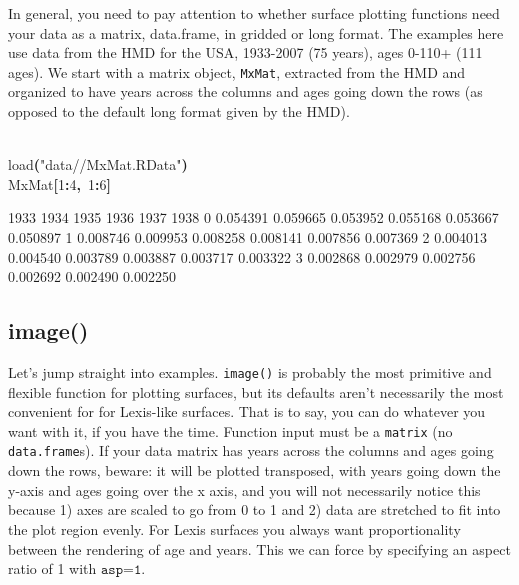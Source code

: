\documentclass[a4paper]{article}
\newcommand{\hlnumber}[1]{\textcolor[rgb]{0.0823529411764706,0.0784313725490196,0.709803921568627}{#1}}%
\newcommand{\hlfunctioncall}[1]{\textcolor[rgb]{1,0,0}{#1}}%
\newcommand{\hlstring}[1]{\textcolor[rgb]{0.6,0.6,1}{#1}}%
\newcommand{\hlkeyword}[1]{\textcolor[rgb]{0,0,0}{\textbf{#1}}}%
\newcommand{\hlsymbol}[1]{\textcolor[rgb]{0,0,0}{#1}}%
\newcommand{\hlprompt}[1]{\textcolor[rgb]{0,0,0}{#1}}%
\newcommand{\hlstd}[1]{\textcolor[rgb]{0,0,0}{#1}}%
\newenvironment{Houtput}{\raggedright}{%
%
}
\renewenvironment{Schunk}{\vspace{\topsep}}{\vspace{\topsep}}
\begin{document}
In general, you need to pay attention to whether surface plotting functions need your data as a matrix, data.frame, in gridded or long format. The examples here use data from the HMD for the USA, 1933-2007 (75 years), ages 0-110+ (111 ages). We start with a matrix object, \texttt{MxMat}, extracted from the HMD and organized to have years across the columns and ages going down the rows (as opposed to the default long format given by the HMD).

\begin{Houtput}
\hspace*{\fill}\\
\hlstd{}\ttfamily\noindent
\hlprompt{\usebox{\hlnormalsizeboxgreaterthan}{\ }}\hlfunctioncall{load}\hlkeyword{(}\hlstring{"data//MxMat.RData"}\hlkeyword{)}\mbox{}
\normalfont
\hspace*{\fill}\\
\hlstd{}\ttfamily\noindent
\hlprompt{\usebox{\hlnormalsizeboxgreaterthan}{\ }}\hlsymbol{MxMat}\hlkeyword{[}\hlnumber{1}\hlkeyword{:}\hlnumber{4}\hlkeyword{,}{\ }\hlnumber{1}\hlkeyword{:}\hlnumber{6}\hlkeyword{]}\mbox{}
\normalfont
\hspace*{\fill}\\
\hlstd{}\begin{Schunk}
\begin{Soutput}
      1933     1934     1935     1936     1937     1938
0 0.054391 0.059665 0.053952 0.055168 0.053667 0.050897
1 0.008746 0.009953 0.008258 0.008141 0.007856 0.007369
2 0.004013 0.004540 0.003789 0.003887 0.003717 0.003322
3 0.002868 0.002979 0.002756 0.002692 0.002490 0.002250
\end{Soutput}

\end{Schunk}
\end{Houtput}


\subsection{image()}
Let's jump straight into examples. \texttt{image()} is probably the most primitive and flexible function for plotting surfaces, but its defaults aren't necessarily the most convenient for for Lexis-like surfaces. That is to say, you can do whatever you want with it, if you have the time. Function input must be a \texttt{matrix} (no \texttt{data.frame}s). If your data matrix has years across the columns and ages going down the rows, beware: it will be plotted transposed, with years going down the y-axis and ages going over the x axis, and you will not necessarily notice this because 1) axes are scaled to go from 0 to 1 and 2) data are stretched to fit into the plot region evenly. For Lexis surfaces you always want proportionality between the rendering of age and years. This we can force by specifying an aspect ratio of 1 with $\texttt{asp=1}$.
\end{document}
